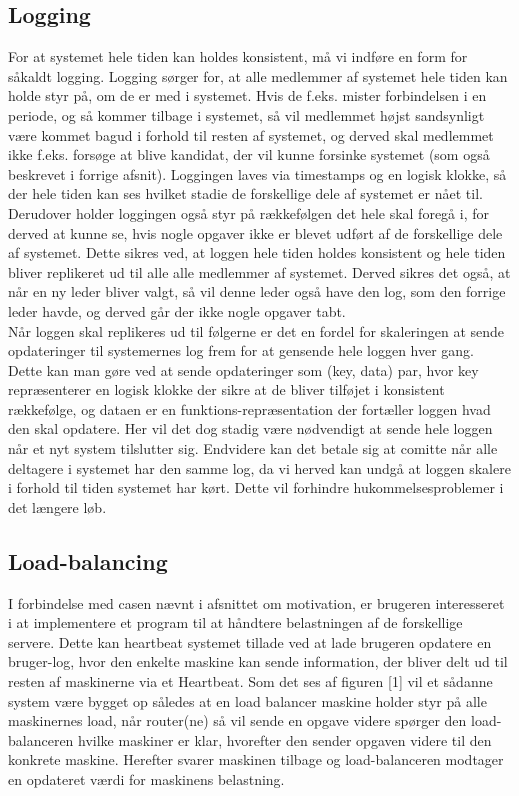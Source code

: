 \documentclass[a4paper,12pt]{article}
\begin{document}
\subsection{Logging}
For at systemet hele tiden kan holdes konsistent, må vi indføre en form for såkaldt logging. Logging sørger for, at alle medlemmer af systemet hele tiden kan holde styr på, om de er med i systemet. Hvis de f.eks. mister forbindelsen i en periode, og så kommer tilbage i systemet, så vil medlemmet højst sandsynligt være kommet bagud i forhold til resten af systemet, og derved skal medlemmet ikke f.eks. forsøge at blive kandidat, der vil kunne forsinke systemet (som også beskrevet i forrige afsnit). Loggingen laves via timestamps og en logisk klokke, så der hele tiden kan ses hvilket stadie de forskellige dele af systemet er nået til. Derudover holder loggingen også styr på rækkefølgen det hele skal foregå i, for derved at kunne se, hvis nogle opgaver ikke er blevet udført af de forskellige dele af systemet. Dette sikres ved, at loggen hele tiden holdes konsistent og hele tiden bliver replikeret ud til alle alle medlemmer af systemet. Derved sikres det også, at når en ny leder bliver valgt, så vil denne leder også have den log, som den forrige leder havde, og derved går der ikke nogle opgaver tabt.
\\
Når loggen skal replikeres ud til følgerne er det en fordel for skaleringen at sende opdateringer til systemernes log frem for at gensende hele loggen hver gang.
Dette kan man gøre ved at sende opdateringer som (key, data) par, hvor key repræsenterer en logisk klokke der sikre at de bliver tilføjet i konsistent rækkefølge, og dataen er en funktions-repræsentation der fortæller loggen hvad den skal opdatere.
Her vil det dog stadig være nødvendigt at sende hele loggen når et nyt system tilslutter sig. Endvidere kan det betale sig at comitte når alle deltagere i systemet har den samme log, da vi herved kan undgå at loggen skalere i forhold til tiden systemet har kørt. Dette vil forhindre hukommelsesproblemer i det længere løb.


\subsection{Load-balancing}
I forbindelse med casen nævnt i afsnittet om motivation, er brugeren interesseret i at implementere et program til at håndtere belastningen af de forskellige servere. Dette kan heartbeat systemet tillade ved at lade brugeren opdatere en bruger-log, hvor den enkelte maskine kan sende information, der bliver delt ud til resten af maskinerne via et Heartbeat. Som det ses af figuren [1] vil et sådanne system være bygget op således at en load balancer maskine holder styr på alle maskinernes load, når router(ne) så vil sende en opgave videre spørger den load-balanceren hvilke maskiner er klar, hvorefter den sender opgaven videre til den konkrete maskine.
Herefter svarer maskinen tilbage og load-balanceren modtager en opdateret værdi for maskinens belastning.
\end{document}
